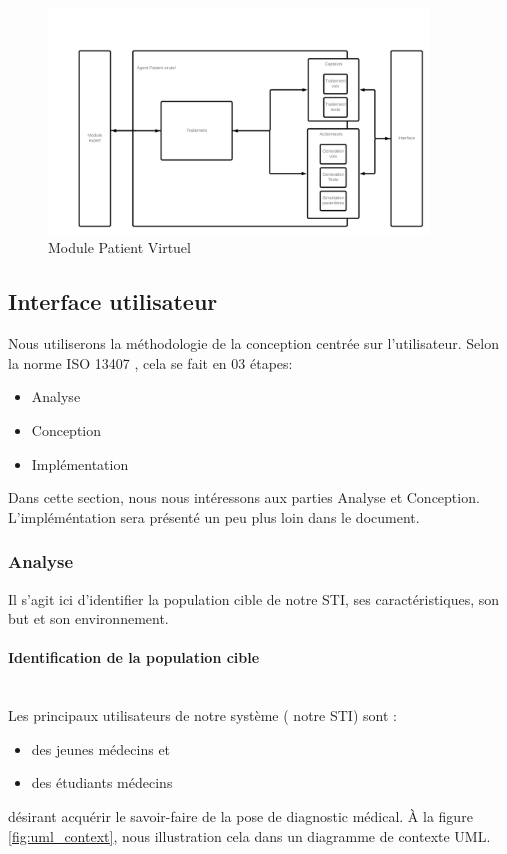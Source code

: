     \begin{figure}[H]
        \centering
        \includegraphics[width=0.9\textwidth]{figures/conc-patient virtuel.png}
        \captionsetup{justification=centering}
        \caption{Module Patient Virtuel}
        \label{fig:5}
    \end{figure}

\newpage

    \subsection{Interface utilisateur}
    Nous utiliserons la méthodologie de la conception centrée sur l'utilisateur. Selon la norme ISO 13407 \cite{iso13407}, cela se fait en 03 étapes:
    \begin{itemize}
        \item Analyse
        \item Conception
        \item Implémentation
    \end{itemize}

    Dans cette section, nous nous intéressons aux parties Analyse et Conception. L'impléméntation sera présenté un peu plus loin dans le document.
    
    \subsubsection{Analyse}
    Il s'agit ici d'identifier la population cible de notre STI, ses caractéristiques, son but et son environnement.
    
    \paragraph{Identification de la population cible} \hfill \\
    Les principaux utilisateurs de notre système ( notre STI) sont :
    \begin{itemize}
        \item des jeunes médecins et
        \item des étudiants médecins
    \end{itemize}
    désirant acquérir le savoir-faire de la pose de diagnostic médical.  À la figure \ref{fig:uml_context}, nous illustration cela dans un diagramme de contexte UML.
    

